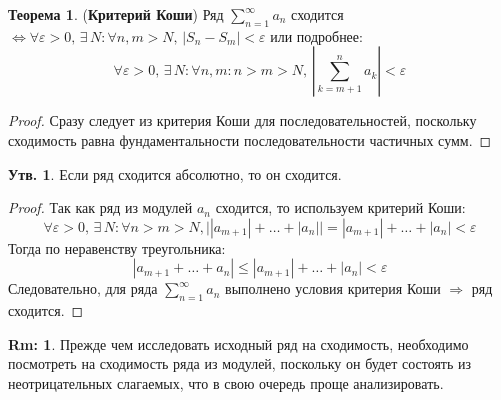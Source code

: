 \documentclass[12pt]{article}
\newcommand{\VE}{\varepsilon}
\theoremstyle{definition}
\newtheorem{rem}{Rm:}
\newtheorem{prop}{Утв.}
\newtheorem{theorem}{Теорема}
\newcommand{\ssum}[1]{\displaystyle \sum\limits_{n=1}^{\infty}{#1}_n}
\begin{document}
\begin{theorem}(\textbf{Критерий Коши})
	Ряд $\ssum{a}$ сходится $\Leftrightarrow \forall \VE > 0, \, \exists \, N \colon \forall n,m > N, \, |S_n - S_m| < \VE$ или подробнее:
	$$
	\forall \VE > 0, \, \exists \, N \colon \forall n, m \colon n > m > N, \, \left|\sum\limits_{k = m+1}^{n} a_k \right| < \VE
	$$
\end{theorem}
\begin{proof}
	Сразу следует из критерия Коши для последовательностей, поскольку сходимость равна фундаментальности последовательности частичных сумм.
\end{proof}

\begin{prop}
	Если ряд сходится абсолютно, то он сходится.
\end{prop}
\begin{proof}
	Так как ряд из модулей $a_n$ сходится, то используем критерий Коши:
	$$
		\forall \VE > 0, \, \exists \, N \colon \forall n > m > N, \big||a_{m+1}| + \dotsc + |a_n|\big| = |a_{m+1}| + \dotsc + |a_n| < \VE
	$$
	Тогда по неравенству треугольника:
	$$
		|a_{m+1} + \dotsc + a_n| \leq  |a_{m+1}| + \dotsc + |a_n| < \VE 
	$$
	Следовательно, для ряда $\ssum{a}$ выполнено условия критерия Коши $\Rightarrow$ ряд сходится.
\end{proof}
\begin{rem}
	Прежде чем исследовать исходный ряд на сходимость, необходимо посмотреть на сходимость ряда из модулей, поскольку он будет состоять из неотрицательных слагаемых, что в свою очередь проще анализировать.
\end{rem}
\end{document}
